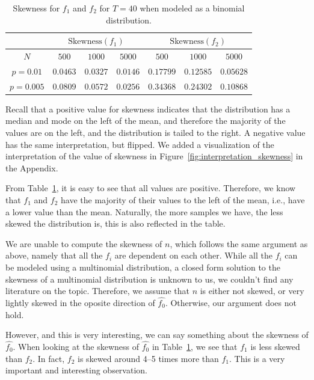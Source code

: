\documentclass{article}
\begin{document}
\begin{table}[t]
    \centering
    \begin{tabular}{c|c c c| c c c}
        \toprule
         & \multicolumn{3}{c}{$\mathrm{Skewness}(f_1)$} & \multicolumn{3}{c}{$\mathrm{Skewness}(f_2)$} \\
        \midrule
        $N$ & $500$ & $1000$ & $5000$ & $500$ & $1000$ & $5000$ \\
        \midrule
        $p=0.01$  & $0.0463$   & $0.0327$  & $0.0146$ & $0.17799$ & $0.12585$ & $0.05628$ \\
        $p=0.005$ & $0.0809$   & $0.0572$  & $0.0256$ & $0.34368$ & $0.24302$ & $0.10868$ \\
    \end{tabular}
    \caption{Skewness for $f_1$ and $f_2$ for $T=40$ when modeled as a binomial distribution.}
    \label{tab:skewness_f1_f2}
\end{table}

Recall that a positive value for skewness indicates that the distribution has a median and mode on the left of the mean, and therefore the majority of the values are on the left, and the distribution is tailed to the right. A negative value has the same interpretation, but flipped. We added a visualization of the interpretation of the value of skewness in Figure~\ref{fig:interpretation_skewness} in the Appendix.

From Table~\ref{tab:skewness_f1_f2}, it is easy to see that all values are positive. Therefore, we know that $f_1$ and $f_2$ have the majority of their values to the left of the mean, i.e., have a lower value than the mean.
Naturally, the more samples we have, the less skewed the distribution is, this is also reflected in the table.

We are unable to compute the skewness of $n$, which follows the same argument as above, namely that all the $f_i$ are dependent on each other. While all the $f_i$ can be modeled using a multinomial distribution, a closed form solution to the skewness of a multinomial distribution is unknown to us, we couldn't find any literature on the topic.
Therefore, we assume that $n$ is either not skewed, or very lightly skewed in the oposite direction of $\hat{f_0}$. Otherwise, our argument does not hold.

However, and this is very interesting, we can say something about the skewness of $\hat{f_0}$.
When looking at the skewness of $\hat{f_0}$ in Table~\ref{tab:skewness_f1_f2}, we see that $f_1$ is less skewed than $f_2$. In fact, $f_2$ is skewed around 4--5 times more than $f_1$.
This is a very important and interesting observation. 
\end{document}
